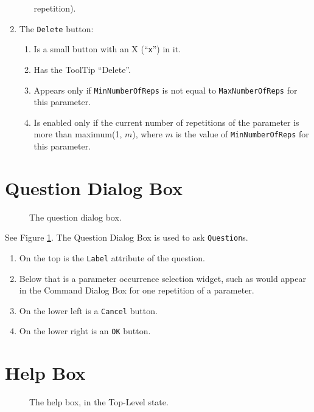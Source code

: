 \documentclass[11pt]{article}
\begin{document}
\begin{enumerate}
\begin{enumerate}
    repetition).
  \end{enumerate}
\item The {\tt Delete} button:
  \begin{enumerate}
  \item Is a small button with an X (``\verb/x/'') in it.
  \item Has the ToolTip ``Delete''.
  \item Appears only if {\tt MinNumberOfReps} is not equal to
    {\tt MaxNumberOfReps} for this parameter.
  \item Is enabled only if the current number of repetitions of the
    parameter is more than maximum(1, $m$), where $m$ is the value
    of {\tt MinNumberOfReps} for this parameter.
  \end{enumerate}
\end{enumerate}

\section{Question Dialog Box}

\begin{figure}

\centerline{\epsfxsize=3in }

\caption{
  The question dialog box.
}
\label{questionDialogBoxFig}
\end{figure}

See Figure \ref{questionDialogBoxFig}.  The Question Dialog Box
is used to ask {\tt Question}s.
\begin{enumerate}
\item On the top is the {\tt Label} attribute of the question.
\item Below that is a parameter occurrence selection widget, such as
  would appear in the Command Dialog Box for one repetition of a parameter.
\item On the lower left is a {\tt Cancel} button.
\item On the lower right is an {\tt OK} button.
\end{enumerate}

\section{Help Box}

\begin{figure}

\centerline{\epsfxsize=4in }

\caption{
  The help box, in the Top-Level state.
}
\label{helpBox01Fig}
\end{figure}
\end{document}
